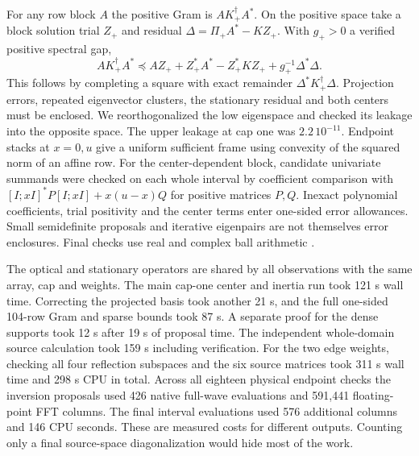 For any row block $A$ the positive Gram is $A K_+^\dagger A^*$. On the positive space take a block solution trial $Z_+$ and residual $\Delta=\Pi_+ A^*-K Z_+$. With $g_+>0$ a verified positive spectral gap,
\[
 A K_+^\dagger A^*\preceq A Z_+ + Z_+^* A^* - Z_+^* K Z_+
                              +g_+^{-1}\Delta^*\Delta .
\]
This follows by completing a square with exact remainder $\Delta^*K_+^\dagger\Delta$. Projection errors, repeated eigenvector clusters, the stationary residual and both centers must be enclosed. We reorthogonalized the low eigenspace and checked its leakage into the opposite space. The upper leakage at cap one was $2.2\,10^{-11}$. Endpoint stacks at $x=0,u$ give a uniform sufficient frame using convexity of the squared norm of an affine row. For the center-dependent block, candidate univariate summands were checked on each whole interval by coefficient comparison with $[I;xI]^*P[I;xI]+x(u-x)Q$ for positive matrices $P,Q$. Inexact polynomial coefficients, trial positivity and the center terms enter one-sided error allowances. Small semidefinite proposals and iterative eigenpairs are not themselves error enclosures. Final checks use real and complex ball arithmetic \cite{arb}.

The optical and stationary operators are shared by all observations with the same array, cap and weights. The main cap-one center and inertia run took 121 s wall time. Correcting the projected basis took another 21 s, and the full one-sided 104-row Gram and sparse bounds took 87 s. A separate proof for the dense supports took 12 s after 19 s of proposal time. The independent whole-domain source calculation took 159 s including verification. For the two edge weights, checking all four reflection subspaces and the six source matrices took 311 s wall time and 298 s CPU in total. Across all eighteen physical endpoint checks the inversion proposals used 426 native full-wave evaluations and 591,441 floating-point FFT columns. The final interval evaluations used 576 additional columns and 146 CPU seconds. These are measured costs for different outputs. Counting only a final source-space diagonalization would hide most of the work.


